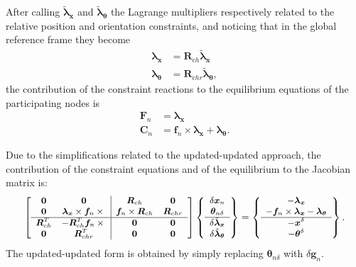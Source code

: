 \documentclass[10pt,fleqn,subeqn]{report}
\newcommand{\T}[1]{\bm{#1}}
\begin{document}
After calling $\tilde{\T{\lambda}}_{\T{x}}$
and $\tilde{\T{\lambda}}_{\T{\theta}}$ the Lagrange multipliers
respectively related to the relative position and orientation
constraints, and noticing that in the global reference frame
they become
\begin{subequations}
\begin{align}
	\T{\lambda}_{\T{x}} &= \T{R}_{ch} \tilde{\T{\lambda}}_{\T{x}} \\
	\T{\lambda}_{\T{\theta}} &= \T{R}_{chr} \tilde{\T{\lambda}}_{\T{\theta}} ,
\end{align}
\end{subequations}
the contribution of the constraint reactions to the equilibrium equations
of the participating nodes is
\begin{subequations}
\begin{align}
	\T{F}_n &= \T{\lambda}_{\T{x}} \\
	\T{C}_n &= \T{f}_n \times \T{\lambda}_{\T{x}} + \T{\lambda}_{\T{\theta}} .
\end{align}
\end{subequations}

Due to the simplifications related to the updated-updated approach,
the contribution of the constraint equations and of the equilibrium 
to the Jacobian matrix is: 
\begin{equation}
	\small
	\sqbr{\matr{cc|cc}{
	\T{0} &
	\T{0} &
	\T{R}_{ch} &
	\T{0} \\
	\T{0} &
	\T{\lambda}_{\T{x}}\times\T{f}_n\times{} &
	\T{f}_n\times\T{R}_{ch} & 
	\T{R}_{chr} \\
	\hline
	\T{R}_{ch}^T &
	-\T{R}_{ch}^T\T{f}_n\times{} & 
	\T{0} &
	\T{0} \\
	\T{0} &
	\T{R}_{chr}^T &
	\T{0} & 
	\T{0}
	}} \cubr{\cvvect{
		\delta\T{x}_n \\
		\T{\theta}_{n\delta} \\
		\hline
		\delta\tilde{\T{\lambda}}_{\T{x}} \\
		\delta\tilde{\T{\lambda}}_{\T{\theta}}
	}}
	= \cubr{\cvvect{
	- \T{\lambda}_{\T{x}} \\
	- \T{f}_n \times \T{\lambda}_{\T{x}} - \T{\lambda}_{\T{\theta}} \\
	\hline
	- \T{x}^{\delta} \\
	- \T{\theta}^{\delta}
	}} .
\end{equation}
The updated-updated form is obtained by simply replacing
$\T{\theta}_{n\delta}$ with $\delta\T{g}_n$.
\end{document}
